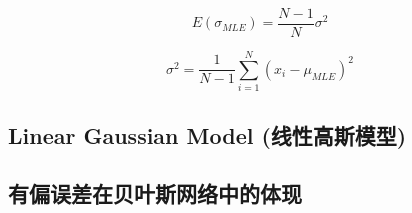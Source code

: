 \documentclass[11pt]{article}
\begin{document}
\begin{enumerate}
\[
E(\sigma_{MLE}) = \frac{N-1}{N} \sigma^2 
\]

\[
\sigma^{2} = \frac{1}{N-1} \sum\limits_{i=1}^N \left( x_i - \mu_{MLE} \right)^{2}
\]
\end{enumerate}

\subsection{Linear Gaussian Model (线性高斯模型)}
\label{sec:org6c0a7f3}
\subsection{有偏误差在贝叶斯网络中的体现}
\label{sec:org21eda2c}
\end{document}
